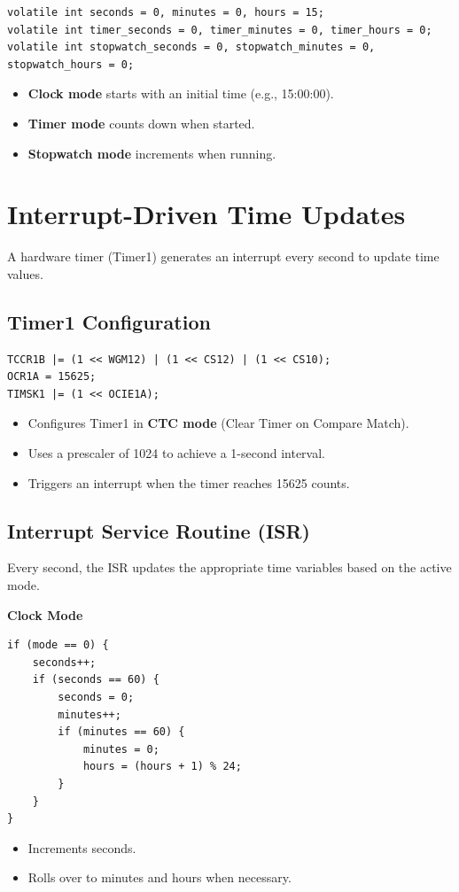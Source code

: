 \documentclass[a4paper,12pt]{article}
\begin{document}
\begin{lstlisting}
volatile int seconds = 0, minutes = 0, hours = 15;
volatile int timer_seconds = 0, timer_minutes = 0, timer_hours = 0;
volatile int stopwatch_seconds = 0, stopwatch_minutes = 0, stopwatch_hours = 0;
\end{lstlisting}

\begin{itemize}
    \item \textbf{Clock mode} starts with an initial time (e.g., 15:00:00).
    \item \textbf{Timer mode} counts down when started.
    \item \textbf{Stopwatch mode} increments when running.
\end{itemize}

\section*{Interrupt-Driven Time Updates}

A hardware timer (Timer1) generates an interrupt every second to update time values.

\subsection*{Timer1 Configuration}

\begin{lstlisting}
TCCR1B |= (1 << WGM12) | (1 << CS12) | (1 << CS10);
OCR1A = 15625;
TIMSK1 |= (1 << OCIE1A);
\end{lstlisting}

\begin{itemize}
    \item Configures Timer1 in \textbf{CTC mode} (Clear Timer on Compare Match).
    \item Uses a prescaler of 1024 to achieve a 1-second interval.
    \item Triggers an interrupt when the timer reaches 15625 counts.
\end{itemize}

\subsection*{Interrupt Service Routine (ISR)}

Every second, the ISR updates the appropriate time variables based on the active mode.

\textbf{Clock Mode}

\begin{lstlisting}
if (mode == 0) {
    seconds++;
    if (seconds == 60) {
        seconds = 0;
        minutes++;
        if (minutes == 60) {
            minutes = 0;
            hours = (hours + 1) % 24;
        }
    }
}
\end{lstlisting}
\begin{itemize}
    \item Increments seconds.
    \item Rolls over to minutes and hours when necessary.
\end{itemize}
\end{document}
